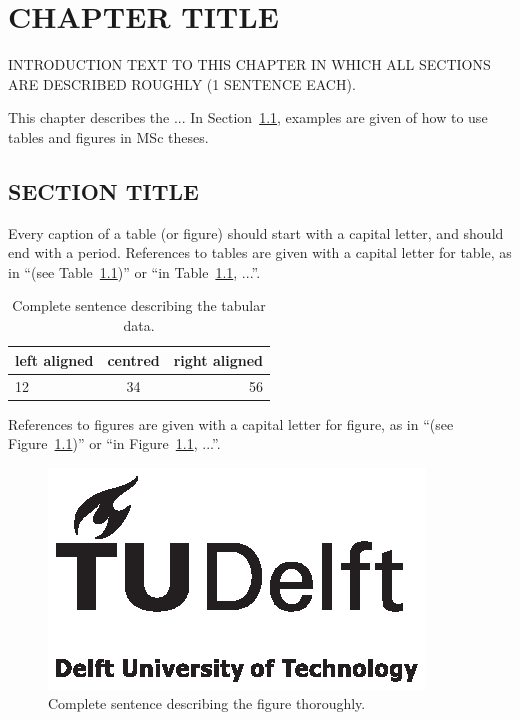 \chapter{CHAPTER TITLE}
\label{chp:CHAPTERTITLE}
INTRODUCTION TEXT TO THIS CHAPTER IN WHICH ALL SECTIONS ARE DESCRIBED ROUGHLY (1 SENTENCE EACH).

This chapter describes the ... In Section~\ref{sec:SECTIONTITLE}, examples are given of how to use tables and figures in MSc theses.

\section{SECTION TITLE}
\label{sec:SECTIONTITLE}

Every caption of a table (or figure) should start with a capital letter, and should end with a period. References to tables are given with a capital letter for table, as in ``(see Table~\ref{tab:EXAMPLETABLE})'' or ``in Table~\ref{tab:EXAMPLETABLE}, ...''.%

\begin{table}[htb]
\centering
\begin{tabular}{|l|c|r|}
\hline %
left aligned & centred & right aligned \\
\hline \hline
12           & 34      & 56            \\
\hline
\end{tabular}
\caption{Complete sentence describing the tabular data.}
\label{tab:EXAMPLETABLE}
\end{table}

References to figures are given with a capital letter for figure, as in ``(see Figure~\ref{fig:EXAMPLEFIGURE})'' or ``in Figure~\ref{fig:EXAMPLEFIGURE}, ...''.

\cite{b}
\cite{a}

\begin{figure}[htb]
\includegraphics[angle=180,width=\textwidth]{pics/TUD_logo_zw}
\caption{Complete sentence describing the figure thoroughly.}
\label{fig:EXAMPLEFIGURE}
\end{figure}


